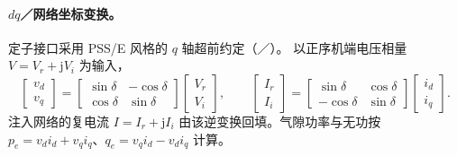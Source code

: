 \paragraph{$dq$／网络坐标变换。}
定子接口采用 PSS/E 风格的 $q$ 轴超前约定（／）。
以正序机端电压相量 $V=V_r+\mathrm jV_i$ 为输入，
\begin{equation}
 \begin{bmatrix}v_d\\ v_q\end{bmatrix}
 =\begin{bmatrix}\sin\delta & -\cos\delta\\ \cos\delta & \sin\delta\end{bmatrix}
  \begin{bmatrix}V_r\\ V_i\end{bmatrix},
 \qquad
 \begin{bmatrix}I_r\\ I_i\end{bmatrix}
 =\begin{bmatrix}\sin\delta & \cos\delta\\ -\cos\delta & \sin\delta\end{bmatrix}
  \begin{bmatrix}i_d\\ i_q\end{bmatrix}.
\end{equation}
注入网络的复电流 $I=I_r+\mathrm jI_i$ 由该逆变换回填。气隙功率与无功按
$p_e=v_di_d+v_qi_q$、$q_e=v_qi_d-v_di_q$ 计算。

